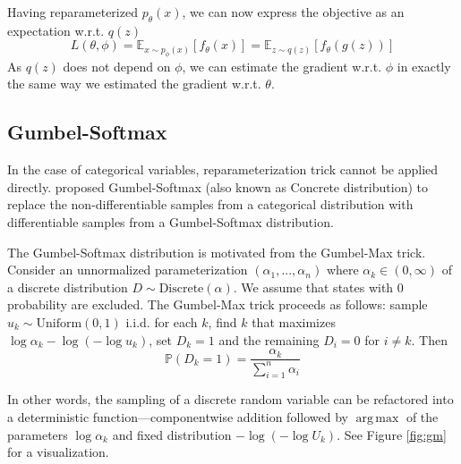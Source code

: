 \documentclass[11pt,a4paper]{article}
\DeclareMathOperator*{\argmax}{arg\,max}
\begin{document}
Having reparameterized $p_\theta(x)$, we can now express the objective as an expectation w.r.t. $q(z)$
\begin{equation}
   L(\theta, \phi) = \mathbb{E}_{x \sim p_\phi(x)}[f_\theta(x)] = \mathbb{E}_{z \sim q(z)}[f_\theta(g(z))]
\end{equation}
As $q(z)$ does not depend on $\phi$, we can estimate the gradient w.r.t. $\phi$ in exactly the same way we estimated the gradient w.r.t. $\theta$.


\subsection{Gumbel-Softmax}
In the case of categorical variables, reparameterization trick cannot be applied directly. \citet{maddison2016concrete, jang2016categorical} proposed Gumbel-Softmax (also known as Concrete distribution) to replace the non-differentiable samples from a categorical distribution with differentiable samples from a Gumbel-Softmax distribution.

The Gumbel-Softmax distribution is motivated from the Gumbel-Max trick. Consider an unnormalized parameterization $(\alpha_1,...,\alpha_n)$ where $\alpha_k \in (0,\infty)$ of a discrete distribution $D \sim \text{Discrete}(\alpha)$. We assume that states with 0 probability are excluded. The Gumbel-Max trick proceeds as follows: sample $u_k \sim \text{Uniform}(0, 1)$ i.i.d. for each $k$, find $k$ that maximizes ${\log\alpha_k -\log(-\log u_k)}$, set $D_k = 1$ and the remaining $D_i = 0$ for $i \neq k$. Then
\begin{equation}
    \mathbb{P}(D_k = 1) = \frac{\alpha_k}{\sum_{i=1}^{n}\alpha_i}
\end{equation}

In other words, the sampling of a discrete random variable can be refactored into a deterministic  function---componentwise addition followed by $\argmax$ of the parameters $\log \alpha_k$ and fixed distribution $-\log(-\log U_k)$. See Figure \ref{fig:gm} for a visualization.
\end{document}
